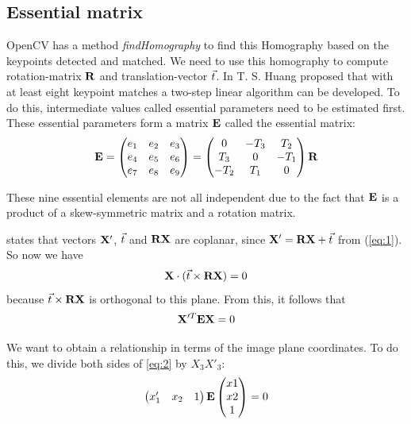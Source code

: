 \subsection{Essential matrix}
OpenCV has a method \textit{findHomography} to find this Homography based on the keypoints detected and matched. We need to use this homography to compute rotation-matrix $\mathbf{R}$ and translation-vector $\vec t$. In \cite{improc} T. S. Huang proposed that with at least eight keypoint matches a two-step linear algorithm can be developed. To do this, intermediate values called essential parameters need to be estimated first. These essential parameters form a matrix $\mathbf{E}$ called the essential matrix:
\begin{equation}
    \mathbf{E} = 
    \begin{pmatrix}
        e_1&e_2&e_3 \\
        e_4&e_5&e_6 \\
        e_7&e_8&e_9 
    \end{pmatrix}
    = \begin{pmatrix}
        0&-T_3&T_2 \\
        T_3&0&-T_1 \\
        -T_2&T_1&0
    \end{pmatrix}
     \mathbf{R}
\end{equation}

These nine essential elements are not all independent due to the fact that  $\mathbf{E}$ is a product of a skew-symmetric matrix and a rotation matrix.\bigskip

\cite{tekalp} states that vectors $\mathbf{X}'$, $\vec t$ and $\mathbf{R}\mathbf{X}$ are coplanar, since $\mathbf{X}' = \mathbf{R}\mathbf{X} + \vec t$ from (\ref{eq:1}). So now we have 
\begin{equation}
    \mathbf{X} \cdot (\vec t \times \mathbf{R}\mathbf{X}) = 0
\end{equation}
because $\vec t \times \mathbf{R}\mathbf{X}$ is orthogonal to this plane. From this, it follows that 
\begin{equation} \label{eq:2}
    \mathbf{X}'^T\mathbf{E}\mathbf{X} = 0
\end{equation}

We want to obtain a relationship in terms of the image plane coordinates. To do this, we divide both sides of \ref{eq:2} by $X_3 X'_3$:
\begin{equation} \label{eq:essential}
    \begin{pmatrix}
        x_1'&x_2&1
    \end{pmatrix}
    \mathbf{E}
    \begin{pmatrix}
        x1 \\
        x2 \\
        1
    \end{pmatrix}
    = 0
\end{equation}

